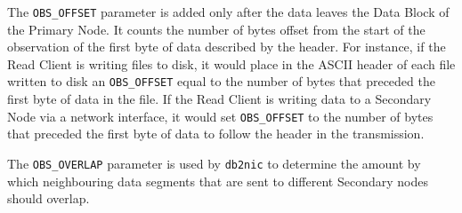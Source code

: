 The {\tt OBS\_OFFSET} parameter is added only after the data leaves
the Data Block of the Primary Node.  It counts the number of bytes
offset from the start of the observation of the first byte of data
described by the header.  For instance, if the Read Client is writing
files to disk, it would place in the ASCII header of each file written
to disk an {\tt OBS\_OFFSET} equal to the number of bytes that
preceded the first byte of data in the file.  If the Read Client is
writing data to a Secondary Node via a network interface, it would set
{\tt OBS\_OFFSET} to the number of bytes that preceded the first byte
of data to follow the header in the transmission.

The {\tt OBS\_OVERLAP} parameter is used by {\tt db2nic} to determine
the amount by which neighbouring data segments that are sent to
different Secondary nodes should overlap.


